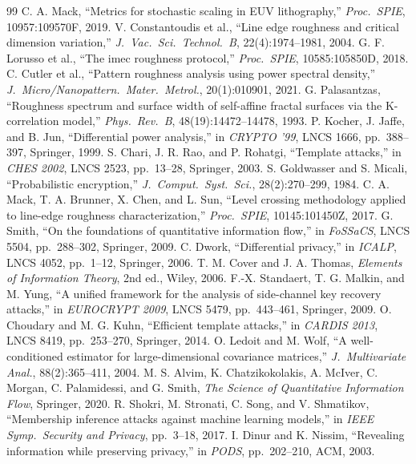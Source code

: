 \documentclass[11pt]{article}
\begin{document}
\begin{thebibliography}{99}
 C. A. Mack, ``Metrics for stochastic scaling in EUV lithography,'' \emph{Proc.\ SPIE}, 10957:109570F, 2019.
 V. Constantoudis et al., ``Line edge roughness and critical dimension variation,'' \emph{J.\ Vac.\ Sci.\ Technol.\ B}, 22(4):1974--1981, 2004.
 G. F. Lorusso et al., ``The imec roughness protocol,'' \emph{Proc.\ SPIE}, 10585:105850D, 2018.
 C. Cutler et al., ``Pattern roughness analysis using power spectral density,'' \emph{J.\ Micro/Nanopattern.\ Mater.\ Metrol.}, 20(1):010901, 2021.
 G. Palasantzas, ``Roughness spectrum and surface width of self-affine fractal surfaces via the K-correlation model,'' \emph{Phys.\ Rev.\ B}, 48(19):14472--14478, 1993.
 P. Kocher, J. Jaffe, and B. Jun, ``Differential power analysis,'' in \emph{CRYPTO '99}, LNCS 1666, pp.\ 388--397, Springer, 1999.
 S. Chari, J. R. Rao, and P. Rohatgi, ``Template attacks,'' in \emph{CHES 2002}, LNCS 2523, pp.\ 13--28, Springer, 2003.
 S. Goldwasser and S. Micali, ``Probabilistic encryption,'' \emph{J.\ Comput.\ Syst.\ Sci.}, 28(2):270--299, 1984.
 C. A. Mack, T. A. Brunner, X. Chen, and L. Sun, ``Level crossing methodology applied to line-edge roughness characterization,'' \emph{Proc.\ SPIE}, 10145:101450Z, 2017.
 G. Smith, ``On the foundations of quantitative information flow,'' in \emph{FoSSaCS}, LNCS 5504, pp.\ 288--302, Springer, 2009.
 C. Dwork, ``Differential privacy,'' in \emph{ICALP}, LNCS 4052, pp.\ 1--12, Springer, 2006.
 T. M. Cover and J. A. Thomas, \emph{Elements of Information Theory}, 2nd ed., Wiley, 2006.
 F.-X. Standaert, T. G. Malkin, and M. Yung, ``A unified framework for the analysis of side-channel key recovery attacks,'' in \emph{EUROCRYPT 2009}, LNCS 5479, pp.\ 443--461, Springer, 2009.
 O. Choudary and M. G. Kuhn, ``Efficient template attacks,'' in \emph{CARDIS 2013}, LNCS 8419, pp.\ 253--270, Springer, 2014.
 O. Ledoit and M. Wolf, ``A well-conditioned estimator for large-dimensional covariance matrices,'' \emph{J.\ Multivariate Anal.}, 88(2):365--411, 2004.
 M. S. Alvim, K. Chatzikokolakis, A. McIver, C. Morgan, C. Palamidessi, and G. Smith, \emph{The Science of Quantitative Information Flow}, Springer, 2020.
 R. Shokri, M. Stronati, C. Song, and V. Shmatikov, ``Membership inference attacks against machine learning models,'' in \emph{IEEE Symp.\ Security and Privacy}, pp.\ 3--18, 2017.
 I. Dinur and K. Nissim, ``Revealing information while preserving privacy,'' in \emph{PODS}, pp.\ 202--210, ACM, 2003.
\end{thebibliography}
\end{document}
